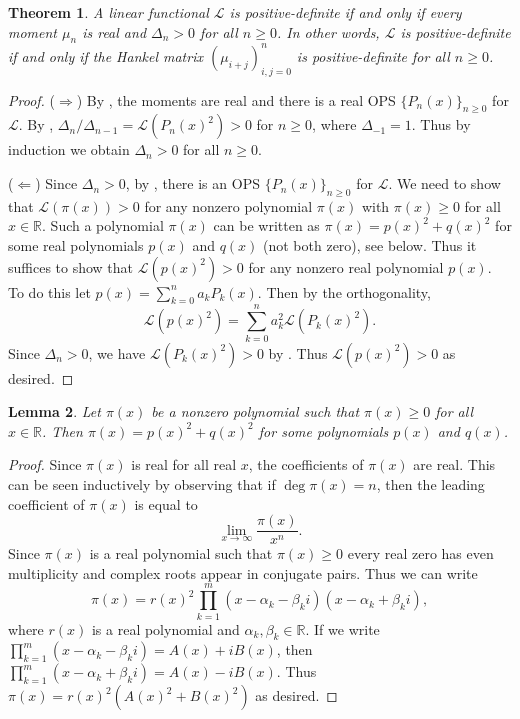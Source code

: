 \documentclass{amsart}
\numberwithin{equation}{section}
\newtheorem{thm}{Theorem}[section]
\newtheorem{lem}[thm]{Lemma}
\theoremstyle{definition}
\newcommand{\RR}{\mathbb{R}}
\newcommand\LL{\mathcal{L}}
\begin{document}
\begin{thm}\label{thm:pos-def-equiv2}
  A linear functional \( \LL \) is positive-definite if and only if
  every moment \( \mu_n \) is real and \( \Delta_n>0 \) for all
  \( n\ge0 \). In other words, \( \LL \) is positive-definite if and
  only if the Hankel matrix \( (\mu_{i+j})_{i,j=0}^n \) is
  positive-definite for all \( n\ge0 \).
\end{thm}
\begin{proof}
  (\(\Rightarrow\)) By , the moments are real
  and there is a real OPS \( \{ P_n(x) \}_{n\ge 0} \) for \( \LL \).
  By , \( \Delta_n/\Delta_{n-1} = \LL(P_n(x)^2)>0 \)
  for \( n\ge0 \), where \( \Delta_{-1}=1 \).
  Thus by induction we obtain \( \Delta_n>0 \) for all \( n\ge0 \).

  (\(\Leftarrow\)) Since \( \Delta_n>0 \), by , there
  is an OPS \( \{ P_n(x) \}_{n\ge 0} \) for \( \LL \). We need to show
  that \( \LL(\pi(x))>0 \) for any nonzero polynomial \( \pi(x) \)
  with \( \pi(x)\ge0 \) for all \( x\in \RR \). Such a polynomial
  \( \pi(x) \) can be written as \( \pi(x) = p(x)^2 + q(x)^2 \) for
  some real polynomials \( p(x) \) and \( q(x) \) (not both zero), see
   below. Thus it suffices to show that
  \( \LL(p(x)^2) > 0 \) for any nonzero real polynomial \( p(x) \). To
  do this let \( p(x) = \sum_{k=0}^n a_k P_k(x) \). Then by the
  orthogonality,
  \[
    \LL(p(x)^2) = \sum_{k=0}^n a_k^2 \LL(P_k(x)^2).
  \]
  Since \( \Delta_n>0 \), we have \( \LL(P_k(x)^2)>0 \) by
  . Thus \( \LL(p(x)^2)>0 \) as desired.
\end{proof}

\begin{lem}\label{lem:pi=p2+q2}
  Let \( \pi(x) \) be a nonzero polynomial such that \( \pi(x)\ge0 \)
  for all \( x\in \RR \). Then \( \pi(x) = p(x)^2 + q(x)^2 \) for some
  polynomials \( p(x) \) and \( q(x) \).
\end{lem}
\begin{proof}
  Since \( \pi(x) \) is real for all real \( x \), the coefficients of
  \( \pi(x) \) are real. This can be seen inductively by observing
  that if \( \deg \pi(x) =n \), then the leading coefficient of
  \( \pi(x) \) is equal to
  \[
    \lim_{x\to \infty} \frac{\pi(x)}{x^n}.
  \]
  Since \( \pi(x) \) is a real polynomial such that \( \pi(x)\ge0 \)
  every real zero has even multiplicity and complex roots appear in
  conjugate pairs. Thus we can write
  \[
    \pi(x) = r(x)^2 \prod_{k=1}^{m} (x-\alpha_k-\beta_ki)(x-\alpha_k+\beta_ki),
  \]
  where \( r(x) \) is a real polynomial and
  \( \alpha_k,\beta_k\in \RR \).
  If we write \( \prod_{k=1}^{m} (x-\alpha_k-\beta_ki) = A(x)+iB(x) \),
  then \( \prod_{k=1}^{m} (x-\alpha_k+\beta_ki) = A(x)-iB(x) \).
  Thus \( \pi(x) = r(x)^2(A(x)^2+B(x)^2) \) as desired.
\end{proof}
\end{document}
